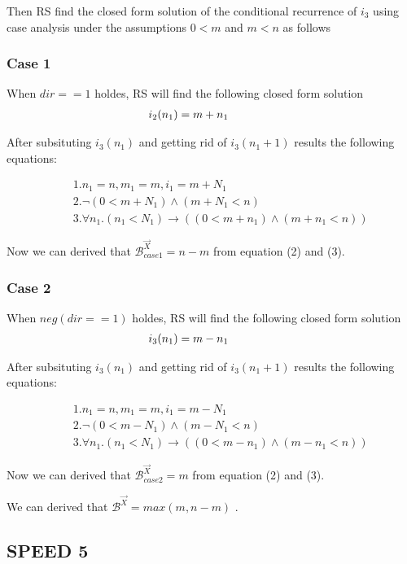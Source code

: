 Then RS find the closed form solution of the conditional recurrence of $i_3$ using case analysis under the assumptions $0<m$ and $m<n$ as follows

\subsubsection{Case 1} When $dir==1$ holdes, RS will find the following closed form solution
\begin{eqnarray*}
	&&\hspace*{-5em}i_2(n_1)=m+n_1
\end{eqnarray*}

After subsituting $i_3(n_1)$ and getting rid of $i_3(n_1+1)$ results the following equations:

\begin{eqnarray*}
	&&1. n_1 = n, m_1 = m, i_1 = m+N_1\\
	&&2.\neg (0<m+N_1) \land (m+N_1<n)\\
    &&3.\forall n_1.(n_1<N_1) \rightarrow ((0<m+n_1) \land (m+n_1<n))
\end{eqnarray*}

Now we can derived that $\mathcal{B}^{\vec{X}}_{case1}=n-m$ from equation (2) and (3).
\subsubsection{Case 2} When $neg (dir==1)$ holdes, RS will find the following closed form solution
\begin{eqnarray*}
	&&\hspace*{-5em}i_3(n_1)=m-n_1
\end{eqnarray*}

After subsituting $i_3(n_1)$ and getting rid of $i_3(n_1+1)$ results the following equations:

\begin{eqnarray*}
	&&1. n_1 = n, m_1 = m, i_1 = m-N_1\\
	&&2.\neg (0<m-N_1) \land (m-N_1<n)\\
	&&3.\forall n_1.(n_1<N_1) \rightarrow ((0<m-n_1) \land (m-n_1<n))
\end{eqnarray*}

Now we can derived that $\mathcal{B}^{\vec{X}}_{case2}=m$ from equation (2) and (3).

We can derived that $\mathcal{B}^{\vec{X}}=max(m,n-m)$ .

\subsection{SPEED 5}

